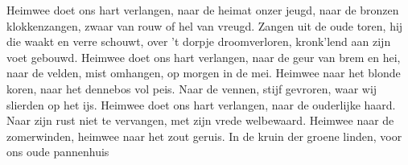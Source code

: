 \beginverse*
Heimwee doet ons hart verlangen,
naar de heimat onzer jeugd, naar de bronzen klokkenzangen,
zwaar van rouw of hel van vreugd.
Zangen uit de oude toren,
hij die waakt en verre schouwt,
over 't dorpje droomverloren,
kronk’lend aan zijn voet gebouwd.
\endverse
\beginverse*
Heimwee doet ons hart verlangen,
naar de geur van brem en hei,
naar de velden, mist omhangen,
op morgen in de mei.
Heimwee naar het blonde koren,
naar het dennebos vol peis.
Naar de vennen, stijf gevroren, 
waar wij slierden op het ijs.
\endverse
\beginverse*
Heimwee doet ons hart verlangen,
naar de ouderlijke haard.
Naar zijn rust niet te vervangen,
met zijn vrede welbewaard.
Heimwee naar de zomerwinden,
heimwee naar het zout geruis.
In de kruin der groene linden, 
voor ons oude pannenhuis
\endverse
\endsong